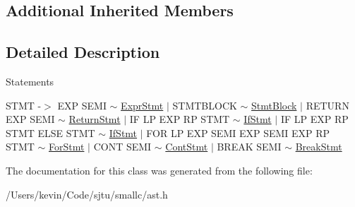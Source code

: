 \subsection*{Additional Inherited Members}


\subsection{Detailed Description}
Statements

S\+T\+MT -\/$>$ E\+XP S\+E\+MI $\sim$ \hyperlink{class_expr_stmt}{Expr\+Stmt} $\vert$ S\+T\+M\+T\+B\+L\+O\+CK $\sim$ \hyperlink{class_stmt_block}{Stmt\+Block} $\vert$ R\+E\+T\+U\+RN E\+XP S\+E\+MI $\sim$ \hyperlink{class_return_stmt}{Return\+Stmt} $\vert$ IF LP E\+XP RP S\+T\+MT $\sim$ \hyperlink{class_if_stmt}{If\+Stmt} $\vert$ IF LP E\+XP RP S\+T\+MT E\+L\+SE S\+T\+MT $\sim$ \hyperlink{class_if_stmt}{If\+Stmt} $\vert$ F\+OR LP E\+XP S\+E\+MI E\+XP S\+E\+MI E\+XP RP S\+T\+MT $\sim$ \hyperlink{class_for_stmt}{For\+Stmt} $\vert$ C\+O\+NT S\+E\+MI $\sim$ \hyperlink{class_cont_stmt}{Cont\+Stmt} $\vert$ B\+R\+E\+AK S\+E\+MI $\sim$ \hyperlink{class_break_stmt}{Break\+Stmt} 

The documentation for this class was generated from the following file\+:\begin{DoxyCompactItemize}
\item 
/\+Users/kevin/\+Code/sjtu/smallc/ast.\+h\end{DoxyCompactItemize}
